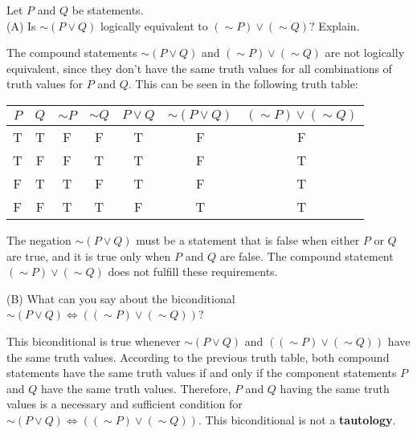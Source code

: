 \documentclass[12pt]{article}
\newenvironment{problem}[2][Problem]{\begin{trivlist}
		\item[\hskip \labelsep {\bfseries #1}\hskip \labelsep {\bfseries #2.}]}{\end{trivlist}}
\newenvironment{solution}[2][Solution]{\begin{trivlist}
		\item[\hskip \labelsep {\bfseries #1}\hskip \labelsep {\bfseries #2.}]}{\end{trivlist}}
\begin{document}
\begin{problem}{52}
	Let $P$ and $Q$ be statements.\\
	
	(A) Is $\sim (P \vee Q)$ logically equivalent to $(\sim P) \vee (\sim Q)$? Explain.
	\begin{solution}{a}
		The compound statements  $\sim (P \vee Q)$ and $(\sim P) \vee (\sim Q)$ are not logically equivalent, since they don't have the same truth values for all combinations of truth values for $P$ and $Q$. This can be seen in the following truth table:
		\begin{center}
			\begin{tabular}{c c c c c c c}
				$P$ & $Q$ & $\sim P$ & $\sim Q$ & $P \vee Q$ & $\sim (P \vee Q)$ & $(\sim P) \vee (\sim Q)$\\
				\hline
				T & T & F & F & T & F & F\\
				T & F & F & T & T & F & T\\
				F & T & T & F & T & F & T\\
				F & F & T & T & F & T & T\\
				\hline
			\end{tabular}
		\end{center}
	The negation $\sim (P \vee Q)$ must be a statement that is false when either $P$ or $Q$ are true, and it is true only when $P$ and $Q$ are false. The compound statement $(\sim P) \vee (\sim Q)$ does not fulfill these requirements.
	\end{solution}
	
	(B) What can you say about the biconditional $\sim(P \vee Q) \Leftrightarrow ((\sim P) \vee (\sim Q))$?
	\begin{solution}{b}
	This biconditional is true whenever $\sim(P \vee Q)$ and $((\sim P) \vee (\sim Q))$ have the same truth values. According to the previous truth table, both compound statements have the same truth values if and only if the component statements $P$ and $Q$ have the same truth values. Therefore, $P$ and $Q$ having the same truth values is a necessary and sufficient condition for $\sim(P \vee Q) \Leftrightarrow ((\sim P) \vee (\sim Q))$. This biconditional is not a \textbf{tautology}.
	\end{solution}
\end{problem}
\end{document}
